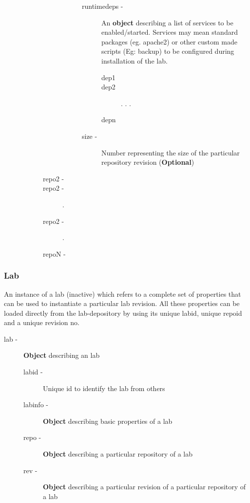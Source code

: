 \documentclass[11pt]{article}
\begin{document}
\begin{description}
\begin{description}
\begin{description}
\begin{description}
\begin{description}
\item [runtimedeps -] An \textbf{object} describing a list of services to be enabled/started. Services may mean
                                standard packages (eg. apache2) or other custom made scripts (Eg: backup)
                                to be configured during installation of the lab.

\begin{description}
\item [dep1]
\item [dep2]
                      .
                      .
                      .
\item [depn]
\end{description}

\item [size -] Number representing the size of the particular repository revision (\textbf{Optional})
\end{description}

\end{description}

\item [repo2 -]
\item [repo2 -].
\item [repo2 -].
\item [repoN -]
\end{description}

\end{description}

\end{description}
\subsubsection{Lab}
\label{sec-3.3.2}


    An instance of a lab (inactive)  which refers to a complete set of
    properties that can be used to instantiate a particular lab
    revision. All these properties can be loaded directly from the
    lab-depository by using its unique labid, unique repoid and a
    unique revision no.

\begin{description}
\item [lab -]  \textbf{Object} describing an lab

\begin{description}
\item [labid -] Unique id to identify the lab from others
\item [labinfo -] \textbf{Object} describing basic properties of a lab
\item [repo -] \textbf{Object} describing a particular repository of a lab
\item [rev -] \textbf{Object} describing a particular revision of a particular
             repository of a lab
\end{description}

\end{description}
\end{document}
